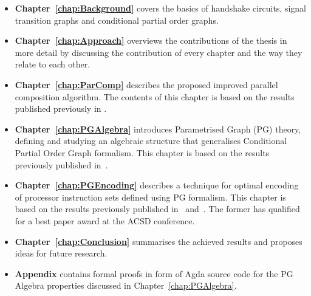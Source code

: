 \begin{itemize}
\item
\textbf{Chapter~\ref{chap:Background}} covers the basics of handshake circuits, signal transition graphs and conditional partial order graphs.

\item
\textbf{Chapter~\ref{chap:Approach}} overviews the contributions of the thesis in more detail by discussing the contribution of every chapter and the way they relate to each other.

\item
\textbf{Chapter~\ref{chap:ParComp}} describes the proposed improved parallel composition algorithm. The contents of this chapter is based on the results published previously in \cite{improved_par_comp}.

\item
\textbf{Chapter~\ref{chap:PGAlgebra}} introduces Parametrised Graph (PG) theory, defining and studying an algebraic structure that generalises Conditional Partial Order Graph formalism. This chapter is based on the results previously published in~\cite{pg_algebra}.

\item
\textbf{Chapter~\ref{chap:PGEncoding}} describes a technique for optimal encoding of processor instruction sets defined using PG formalism. This chapter is based on the results previously published in~\cite{cpog_encoding_best_paper} and~\cite{cpog_encoding}. The former has qualified for a best paper award at the ACSD conference.

\item
\textbf{Chapter~\ref{chap:Conclusion}} summarises the achieved results and proposes ideas for future research.

\item
\textbf{Appendix} contains formal proofs in form of Agda source code for the PG Algebra properties discussed in Chapter~\ref{chap:PGAlgebra}.

\end{itemize}
